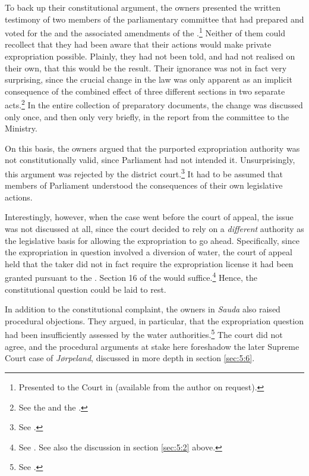 To back up their constitutional argument, the owners presented the written testimony of two members of the parliamentary committee that had prepared and voted for the \cite{wra00} and the associated amendments of the \cite{ea59}.\footnote{Presented to the Court in \cite{sauda07} (available from the author on request).} Neither of them could recollect that they had been aware that their actions would make private expropriation possible. Plainly, they had not been told, and had not realised on their own, that this would be the result. Their ignorance was not in fact very surprising, since the crucial change in the law was only apparent as an implicit consequence of the combined effect of three different sections in two separate acts.\footnote{See the \dni\cite[51]{wra00} and the \dni\cite[2, 3]{ea59}.} In the entire collection of preparatory documents, the change was discussed only once, and then only very briefly, in the report from the committee to the Ministry.

On this basis, the owners argued that the purported expropriation authority was not constitutionally valid, since Parliament had not intended it. Unsurprisingly, this argument was rejected by the district court.\footnote{See \cite{sauda07}.} It had to be assumed that members of Parliament understood the consequences of their own legislative actions. 

Interestingly, however, when the case went before the court of appeal, the issue was not discussed at all, since the court decided to rely on a {\it different} authority as the legislative basis for allowing the expropriation to go ahead. Specifically, since the expropriation in question involved a diversion of water, the court of appeal held that the taker did not in fact require the expropriation license it had been granted pursuant to the \cite{ea59}. Section 16 of the \cite{wra17} would suffice.\footnote{See \cite{sauda09}. See also the discussion in section \ref{sec:5:2} above.} Hence, the constitutional question could be laid to rest.

In addition to the constitutional complaint, the owners in {\it Sauda} also raised procedural objections. They argued, in particular, that the expropriation question had been insufficiently assessed by the water authorities.\footnote{See \cite{sauda09}.} The court did not agree, and the procedural arguments at stake here foreshadow the later Supreme Court case of {\it Jørpeland}, discussed in more depth in section \ref{sec:5:6}.

